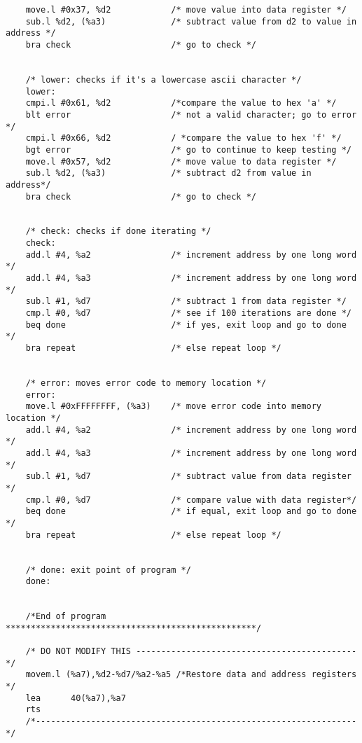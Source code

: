 \documentclass[10pt, letterpaper, titlepage]{article} %
\begin{document}
\begin{lstlisting}
	move.l #0x37, %d2            /* move value into data register */
	sub.l %d2, (%a3)             /* subtract value from d2 to value in address */
	bra check                    /* go to check */
	
	
	/* lower: checks if it's a lowercase ascii character */
	lower:
	cmpi.l #0x61, %d2            /*compare the value to hex 'a' */
	blt error                    /* not a valid character; go to error */
	cmpi.l #0x66, %d2            / *compare the value to hex 'f' */
	bgt error                    /* go to continue to keep testing */
	move.l #0x57, %d2            /* move value to data register */
	sub.l %d2, (%a3)             /* subtract d2 from value in address*/
	bra check                    /* go to check */
	
	
	/* check: checks if done iterating */
	check:
	add.l #4, %a2                /* increment address by one long word */
	add.l #4, %a3                /* increment address by one long word */
	sub.l #1, %d7                /* subtract 1 from data register */
	cmp.l #0, %d7                /* see if 100 iterations are done */
	beq done                     /* if yes, exit loop and go to done */
	bra repeat                   /* else repeat loop */
	
	
	/* error: moves error code to memory location */
	error:
	move.l #0xFFFFFFFF, (%a3)    /* move error code into memory location */
	add.l #4, %a2                /* increment address by one long word */
	add.l #4, %a3                /* increment address by one long word */
	sub.l #1, %d7                /* subtract value from data register */
	cmp.l #0, %d7                /* compare value with data register*/
	beq done                     /* if equal, exit loop and go to done */
	bra repeat                   /* else repeat loop */
	
	
	/* done: exit point of program */
	done:
	
	
	/*End of program **************************************************/
	
	/* DO NOT MODIFY THIS --------------------------------------------*/
	movem.l (%a7),%d2-%d7/%a2-%a5 /*Restore data and address registers */
	lea      40(%a7),%a7 
	rts
	/*----------------------------------------------------------------*/
\end{lstlisting}
\end{document}
